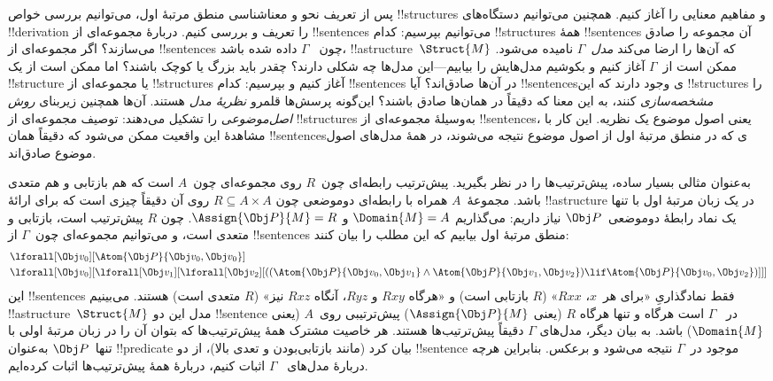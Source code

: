 \documentclass[../../../include/open-logic-section]{subfiles}
\begin{document}


پس از تعریف نحو و معناشناسی منطق مرتبهٔ اول، می‌توانیم بررسی خواص
!!{structure}s و مفاهیم معنایی را آغاز کنیم. همچنین می‌توانیم
دستگاه‌های !!{derivation} را تعریف و بررسی کنیم. دربارهٔ مجموعه‌ای از
!!{sentence}s می‌توانیم بپرسیم: کدام !!{structure}s همهٔ !!{sentence}s
آن مجموعه را صادق می‌سازند؟ اگر مجموعه‌ای از !!{sentence}s چون
~$\Gamma$ داده شده باشد، !!a{structure}~$\Struct{M}$ که آن‌ها را ارضا
می‌کند \emph{مدل~$\Gamma$} نامیده می‌شود. ممکن است از~$\Gamma$ آغاز
کنیم و بکوشیم مدل‌هایش را بیابیم---این مدل‌ها چه شکلی دارند؟ چقدر باید
بزرگ یا کوچک باشند؟ اما ممکن است از یک !!{structure} یا مجموعه‌ای از
!!{structure}s آغاز کنیم و بپرسیم: کدام !!{sentence}s در آن‌ها
صادق‌اند؟ آیا !!{sentence}sی وجود دارند که این !!{structure}s را
\emph{مشخصه‌سازی} کنند، به این معنا که دقیقاً در همان‌ها صادق باشند؟
این‌گونه پرسش‌ها قلمرو \emph{نظریهٔ مدل} هستند. آن‌ها همچنین زیربنای
\emph{روش اصل‌موضوعی} را تشکیل می‌دهند: توصیف مجموعه‌ای از
!!{structure}s به‌وسیلهٔ مجموعه‌ای از !!{sentence}s، یعنی اصول موضوع
یک نظریه. این کار با مشاهدهٔ این واقعیت ممکن می‌شود که دقیقاً همان
!!{sentence}sی که در منطق مرتبهٔ اول از اصول موضوع نتیجه می‌شوند، در
همهٔ مدل‌های اصول موضوع صادق‌اند.

به‌عنوان مثالی بسیار ساده، پیش‌ترتیب‌ها را در نظر بگیرید. پیش‌ترتیب
رابطه‌ای چون~$R$ روی مجموعه‌ای چون~$A$ است که هم بازتابی و هم متعدی
باشد. مجموعهٔ~$A$ همراه با رابطه‌ای دوموضعی چون
$R \subseteq A \times A$ روی آن دقیقاً چیزی است که برای ارائهٔ
!!a{structure} در یک زبان مرتبهٔ اول با تنها یک نماد رابطهٔ
دوموضعی~$\Obj P$ نیاز داریم: می‌گذاریم $\Domain{M} = A$ و
$\Assign{\Obj P}{M} = R$. چون $R$ پیش‌ترتیب است، بازتابی و متعدی است،
و می‌توانیم مجموعه‌ای چون~$\Gamma$ از !!{sentence}s منطق مرتبهٔ اول
بیابیم که این مطلب را بیان کنند:
\begin{align*}
  & \lforall[\Obj v_0][\Atom{\Obj P}{\Obj v_0,\Obj v_0}]\\
  & \lforall[\Obj v_0][\lforall[\Obj v_1][\lforall[\Obj v_2][((\Atom{\Obj P}{\Obj v_0,\Obj v_1} \land \Atom{\Obj P}{\Obj v_1,\Obj v_2}) \lif \Atom{\Obj P}{\Obj v_0,\Obj v_2})]]]
\end{align*}
این !!{sentence}s فقط نمادگذاریِ «برای هر~$x$، $Rxx$» ($R$ بازتابی
است) و «هرگاه $Rxy$ و $Ryz$، آنگاه $Rxz$ نیز» ($R$ متعدی است) هستند.
می‌بینیم !!a{structure}~$\Struct{M}$ مدل این دو !!{sentence} در
~$\Gamma$ است هرگاه و تنها هرگاه $R$ (یعنی $\Assign{\Obj P}{M}$)
پیش‌ترتیبی روی~$A$ (یعنی $\Domain{M}$) باشد. به بیان دیگر، مدل‌های
$\Gamma$ دقیقاً پیش‌ترتیب‌ها هستند. هر خاصیت مشترک همهٔ پیش‌ترتیب‌ها که
بتوان آن را در زبان مرتبهٔ اولی با تنها~$\Obj P$ به‌عنوان !!{predicate}
بیان کرد (مانند بازتابی‌بودن و تعدی بالا)، از دو !!{sentence} موجود
در~$\Gamma$ نتیجه می‌شود و برعکس. بنابراین هرچه دربارهٔ مدل‌های
~$\Gamma$ اثبات کنیم، دربارهٔ همهٔ پیش‌ترتیب‌ها اثبات کرده‌ایم.
\end{document}
